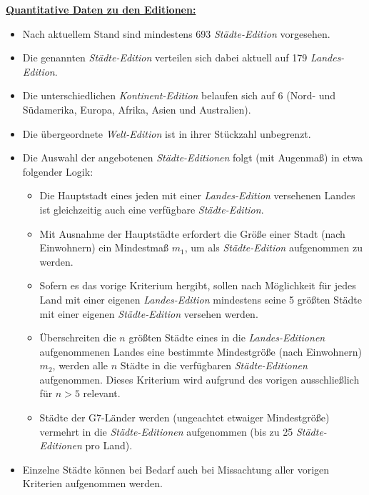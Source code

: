 \vspace{0.24cm}

\underline{\textbf{Quantitative Daten zu den Editionen:}}

\begin{itemize}
    \item Nach aktuellem Stand sind mindestens 693 \textit{Städte-Edition} vorgesehen.
    \item Die genannten \textit{Städte-Edition} verteilen sich dabei aktuell auf 179 \textit{Landes-Edition}.
    \item Die unterschiedlichen \textit{Kontinent-Edition} belaufen sich auf 6 (Nord- und Südamerika, Europa, Afrika, Asien und Australien).
    \item Die übergeordnete \textit{Welt-Edition} ist in ihrer Stückzahl unbegrenzt. 
    \item Die Auswahl der angebotenen \textit{Städte-Editionen} folgt (mit Augenmaß) in etwa folgender Logik:
    \begin{itemize}
    	\item Die Hauptstadt eines jeden mit einer \textit{Landes-Edition} versehenen Landes ist gleichzeitig auch eine verfügbare \textit{Städte-Edition}.
    	\item Mit Ausnahme der Hauptstädte erfordert die Größe einer Stadt (nach Einwohnern) ein Mindestmaß $m_1$, um als \textit{Städte-Edition} aufgenommen zu werden.
    	\item Sofern es das vorige Kriterium hergibt, sollen nach Möglichkeit für jedes Land mit einer eigenen \textit{Landes-Edition} mindestens seine 5 größten Städte mit einer eigenen \textit{Städte-Edition} versehen werden.
    	\item Überschreiten die $n$ größten Städte eines in die \textit{Landes-Editionen} aufgenommenen Landes eine bestimmte Mindestgröße (nach Einwohnern) $m_2$, werden alle $n$ Städte in die verfügbaren \textit{Städte-Editionen} aufgenommen. Dieses Kriterium wird aufgrund des vorigen ausschließlich für $n > 5$ relevant.
    	\item Städte der G7-Länder werden (ungeachtet etwaiger Mindestgröße) vermehrt in die \textit{Städte-Editionen} aufgenommen (bis zu 25 \textit{Städte-Editionen} pro Land).
    \end{itemize} 
    \item Einzelne Städte können bei Bedarf auch bei Missachtung aller vorigen Kriterien aufgenommen werden.
\end{itemize}

\vspace{0.5cm}





